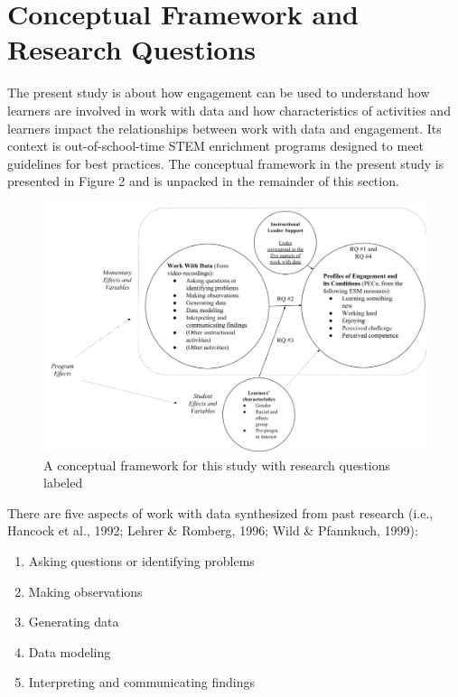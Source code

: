 \documentclass[]{book}
\providecommand{\tightlist}{%
  \setlength{\itemsep}{0pt}\setlength{\parskip}{0pt}}
\theoremstyle{definition}
\theoremstyle{definition}
\theoremstyle{definition}
\theoremstyle{remark}
\begin{document}
\section{Conceptual Framework and Research
Questions}\label{conceptual-framework-and-research-questions}

The present study is about how engagement can be used to understand how
learners are involved in work with data and how characteristics of
activities and learners impact the relationships between work with data
and engagement. Its context is out-of-school-time STEM enrichment
programs designed to meet guidelines for best practices. The conceptual
framework in the present study is presented in Figure 2 and is unpacked
in the remainder of this section.

\begin{figure}

{\centering \includegraphics[width=0.8\linewidth]{images/figure2} 

}

\caption{A conceptual framework for this study with research questions labeled}\label{fig:unnamed-chunk-2}
\end{figure}

There are five aspects of work with data synthesized from past research
(i.e., Hancock et al., 1992; Lehrer \& Romberg, 1996; Wild \& Pfannkuch,
1999):

\begin{enumerate}
\def\labelenumi{\arabic{enumi}.}
\tightlist
\item
  Asking questions or identifying problems
\item
  Making observations
\item
  Generating data
\item
  Data modeling
\item
  Interpreting and communicating findings
\end{enumerate}
\end{document}
